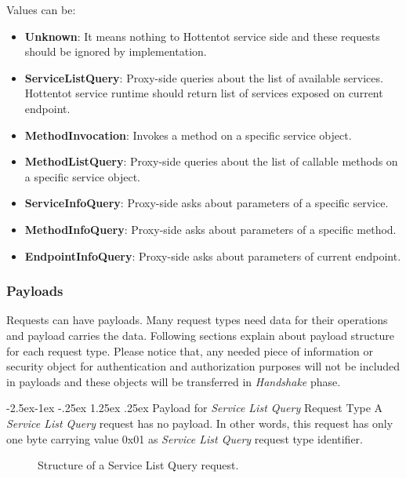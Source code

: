 \documentclass[10pt,a4paper]{article}
\makeatletter
\renewcommand\paragraph{\@startsection{paragraph}{4}{\z@}%
            {-2.5ex\@plus -1ex \@minus -.25ex}%
            {1.25ex \@plus .25ex}%
            {\normalfont\normalsize\bfseries}}
\makeatother
\begin{document}
\noindent
Values can be:
\begin{itemize}
  \item \textbf{Unknown}: It means nothing to Hottentot service side and these requests should be ignored by implementation.
  \item \textbf{ServiceListQuery}: Proxy-side queries about the list of available services. Hottentot service runtime should return list of services exposed on current endpoint.
  \item \textbf{MethodInvocation}: Invokes a method on a specific service object.
  \item \textbf{MethodListQuery}: Proxy-side queries about the list of callable methods on a specific service object.
  \item \textbf{ServiceInfoQuery}: Proxy-side asks about parameters of a specific service.
  \item \textbf{MethodInfoQuery}: Proxy-side asks about parameters of a specific method.
  \item \textbf{EndpointInfoQuery}: Proxy-side asks about parameters of current endpoint.
\end{itemize}

\subsubsection{Payloads}
Requests can have payloads. Many request types need data for their operations and payload carries the data. Following sections explain about payload structure for each request type. Please notice that, any needed piece of information or security object for authentication and authorization purposes will not be included in payloads and these objects will be transferred in \textit{Handshake} phase.

\paragraph{Payload for \textit{Service List Query} Request Type}
A \textit{Service List Query} request has no payload. In other words, this request has only one byte carrying value 0x01 as \textit{Service List Query} request type identifier.

\begin{figure}[!ht]
  \caption{Structure of a Service List Query request.}
  \centering
\end{figure}
\end{document}
